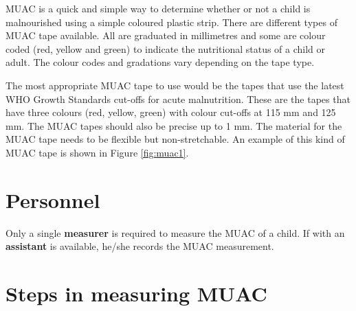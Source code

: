 \documentclass[
  12pt,
]{book}
\begin{document}
MUAC is a quick and simple way to determine whether or not a child is malnourished using a simple coloured plastic strip. There are different types of MUAC tape available. All are graduated in millimetres and some are colour coded (red, yellow and green) to indicate the nutritional status of a child or adult. The colour codes and gradations vary depending on the tape type.

The most appropriate MUAC tape to use would be the tapes that use the latest WHO Growth Standards cut-offs for acute malnutrition. These are the tapes that have three colours (red, yellow, green) with colour cut-offs at 115 mm and 125 mm. The MUAC tapes should also be precise up to 1 mm. The material for the MUAC tape needs to be flexible but non-stretchable. An example of this kind of MUAC tape is shown in Figure \ref{fig:muac1}.

\hypertarget{personnel-2}{%
\section{Personnel}\label{personnel-2}}

Only a single \textbf{measurer} is required to measure the MUAC of a child. If with an \textbf{assistant} is available, he/she records the MUAC measurement.

\hypertarget{steps-in-measuring-muac}{%
\section{Steps in measuring MUAC}\label{steps-in-measuring-muac}}
\end{document}
